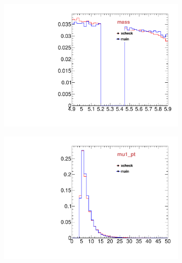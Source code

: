\begin{figure}
\begin{subfigure}[b]{0.2\textwidth}
                \includegraphics[width=\textwidth]{Figures/VariablesComparison/Data_endcaps_figs/m}
                \label{fig:Data_endcaps_m}
        \end{subfigure}
        \begin{subfigure}[b]{0.2\textwidth}
                \centering
                \includegraphics[width=\textwidth]{Figures/VariablesComparison/Data_endcaps_figs/m1pt}
                \label{fig:Data_endcaps_m1pt}
        \end{subfigure}
        \begin{subfigure}[b]{0.2\textwidth}
                \centering

\end{subfigure}
\end{figure}
